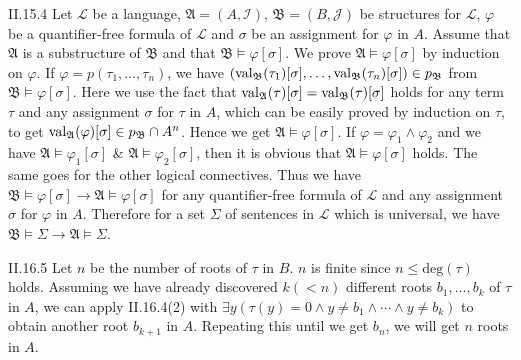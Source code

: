 \documentclass[12pt]{article}
\begin{document}
\begin{customthm}{II.15.4}
  Let $\mathcal{L}$ be a language, $\mathfrak{A}=(A,\mathcal{I})$, $\mathfrak{B}=(B,\mathcal{J})$ be structures for $\mathcal{L}$, $\varphi$ be a quantifier-free formula of $\mathcal{L}$ and $\sigma$ be an assignment for $\varphi$ in $A$. Assume that $\mathfrak{A}$ is a substructure of $\mathfrak{B}$ and that $\mathfrak{B}\models\varphi[\sigma]$. We prove $\mathfrak{A}\models\varphi[\sigma]$ by induction on $\varphi$. If $\varphi=p(\tau_1,\ldots,\tau_n)$, we have $(\mathop{\mathrm{val}}_{\mathfrak{B}}(\tau_1)[\sigma],\ldots,\mathop{\mathrm{val}}_{\mathfrak{B}}(\tau_n)[\sigma])\in p_\mathfrak{B}$ from $\mathfrak{B}\models\varphi[\sigma]$. Here we use the fact that $\mathop{\mathrm{val}}_{\mathfrak{A}}(\tau)[\sigma]=\mathop{\mathrm{val}}_{\mathfrak{B}}(\tau)[\sigma]$ holds for any term $\tau$ and any assignment $\sigma$ for $\tau$ in $A$, which can be easily proved by induction on $\tau$, to get $\mathop{\mathrm{val}}_{\mathfrak{A}}(\varphi)[\sigma]\in p_\mathfrak{B}\cap A^n$. Hence we get $\mathfrak{A}\models\varphi[\sigma]$. If $\varphi=\varphi_1\wedge\varphi_2$ and we have  $\mathfrak{A}\models\varphi_1[\sigma]$ \& $\mathfrak{A}\models\varphi_2[\sigma]$, then it is obvious that $\mathfrak{A}\models\varphi[\sigma]$ holds. The same goes for the other logical connectives. Thus we have $\mathfrak{B}\models\varphi[\sigma]\rightarrow\mathfrak{A}\models\varphi[\sigma]$ for any quantifier-free formula of $\mathcal{L}$ and any assignment $\sigma$ for $\varphi$ in $A$. Therefore for a set $\Sigma$ of sentences in $\mathcal{L}$ which is universal, we have $\mathfrak{B}\models\Sigma\rightarrow\mathfrak{A}\models\Sigma$.
\end{customthm}

\begin{customthm}{II.16.5}
  Let $n$ be the number of roots of $\tau$ in $B$. $n$ is finite since $n\leq\textrm{deg}(\tau)$ holds. Assuming we have already discovered $k(<n)$ different roots $b_1,\ldots,b_k$ of $\tau$ in $A$, we can apply II.16.4(2) with $\exists y(\tau(y)=0\wedge y\neq b_1\wedge\cdots\wedge y\neq b_k)$ to obtain another root $b_{k+1}$ in $A$. Repeating this until we get $b_n$, we will get $n$ roots in $A$.
\end{customthm}
\end{document}

